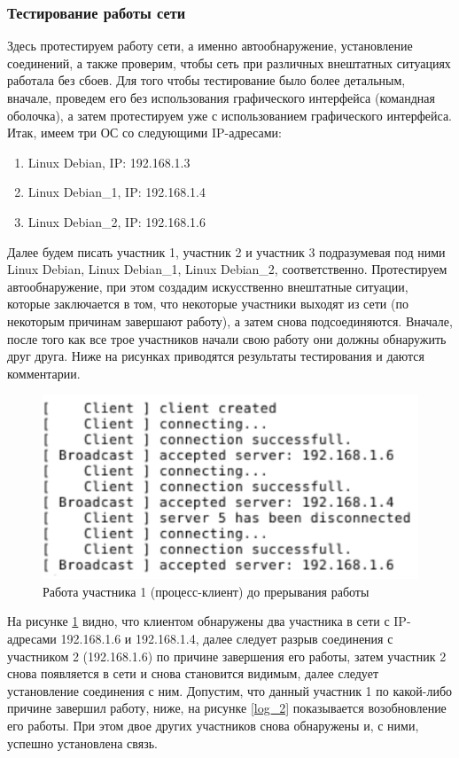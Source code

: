 \subsubsection*{Тестирование работы сети}
Здесь протестируем работу сети, а именно автообнаружение, установление
соединений, а также проверим, чтобы сеть при различных внештатных
ситуациях работала без сбоев.
\newpar
Для того чтобы тестирование было более детальным, вначале, проведем его
без использования графического интерфейса (командная оболочка), а затем
протестируем уже с использованием графического интерфейса.
\newpar
Итак, имеем три ОС со следующими IP-адресами:
\begin{enumerate}
    \item Linux Debian, IP: 192.168.1.3
    \item Linux Debian\_1, IP: 192.168.1.4
    \item Linux Debian\_2, IP: 192.168.1.6
\end{enumerate}

Далее будем писать участник 1, участник 2 и участник 3 подразумевая под
ними Linux Debian, Linux Debian\_1, Linux Debian\_2, соответственно.
\newpar
Протестируем автообнаружение, при этом создадим искусственно
внештатные ситуации, которые заключается в том, что некоторые
участники выходят из сети (по некоторым причинам завершают работу), а
затем снова подсоединяются. Вначале, после того как все трое участников
начали свою работу они должны обнаружить друг друга. Ниже на
рисунках приводятся результаты тестирования и даются комментарии.

\begin{figure}[!hbt]
    \centering
    \includegraphics{log_1}
    \caption{Работа участника 1 (процесс-клиент) до прерывания работы}\label{log_1}
\end{figure}
\newpar
На рисунке \ref{log_1} видно, что клиентом обнаружены два участника в сети с IP-адресами
192.168.1.6 и 192.168.1.4, далее следует разрыв соединения с
участником 2 (192.168.1.6) по причине завершения его работы, затем участник 2
снова появляется в сети и снова становится
видимым, далее следует
установление соединения с ним.
\newpar
Допустим, что данный участник 1 по какой-либо причине завершил работу, ниже, на рисунке \ref{log_2} показывается
возобновление его работы. При этом двое других участников снова обнаружены
и, с ними, успешно установлена связь.

